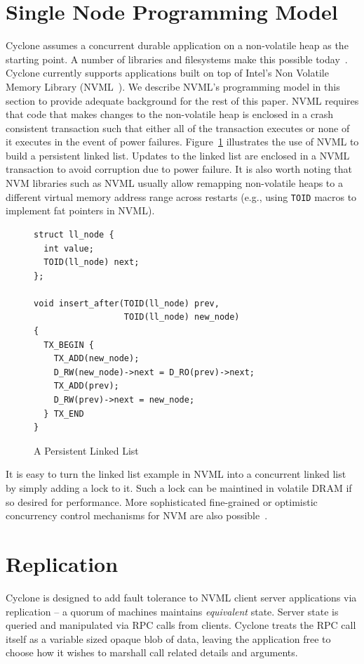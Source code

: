 \documentclass[letterpaper,twocolumn,10pt]{article}
\begin{document}
\section{Single Node Programming Model}
Cyclone assumes a concurrent durable application on a non-volatile heap as the
starting point. A number of libraries and filesystems make this possible
today~\cite{nvml, dax, pmfs, mnemosyne, nvheaps, cdds}. Cyclone currently
supports applications built on top of Intel's Non Volatile Memory Library
(NVML~\cite{nvml}). We describe NVML's programming model in this section to
provide adequate background for the rest of this paper. NVML requires 
that code that makes changes to the non-volatile heap is enclosed in a crash
consistent transaction such that either all of the transaction executes or none
of it executes in the event of power failures.
Figure~\ref{fig:example} illustrates the use of NVML to build a persistent
linked list. Updates to the linked list are enclosed in a NVML transaction to
avoid corruption due to power failure. It is also worth noting that NVM
libraries such as NVML usually allow remapping non-volatile heaps to a different
virtual memory address range across restarts (e.g., using {\tt TOID} macros to
implement fat pointers in NVML).

\begin{figure}
  { \scriptsize
\begin{verbatim}
struct ll_node {
  int value;
  TOID(ll_node) next;
};

void insert_after(TOID(ll_node) prev, 
                  TOID(ll_node) new_node)
{
  TX_BEGIN {
    TX_ADD(new_node);
    D_RW(new_node)->next = D_RO(prev)->next;
    TX_ADD(prev);
    D_RW(prev)->next = new_node;
  } TX_END
}

\end{verbatim}
  }
\vspace{-0.2in}
\caption{A Persistent Linked List}
\label{fig:example}
\end{figure}

It is easy to turn the linked list example in NVML into a concurrent linked list
by simply adding a lock to it. Such a lock can be maintined in volatile DRAM if
so desired for performance. More sophisticated fine-grained or optimistic
concurrency control mechanisms for NVM are also
possible~\cite{mnemosyne, cdds, nvheaps}.

\section{Replication}
Cyclone is designed to add fault tolerance to NVML client server applications
via replication -- a quorum of machines maintains \emph{equivalent} state.
Server state is queried and manipulated via RPC calls from clients.  Cyclone
treats the RPC call itself as a variable sized opaque blob of data, leaving the
application free to choose how it wishes to marshall call related details and
arguments.
\end{document}
